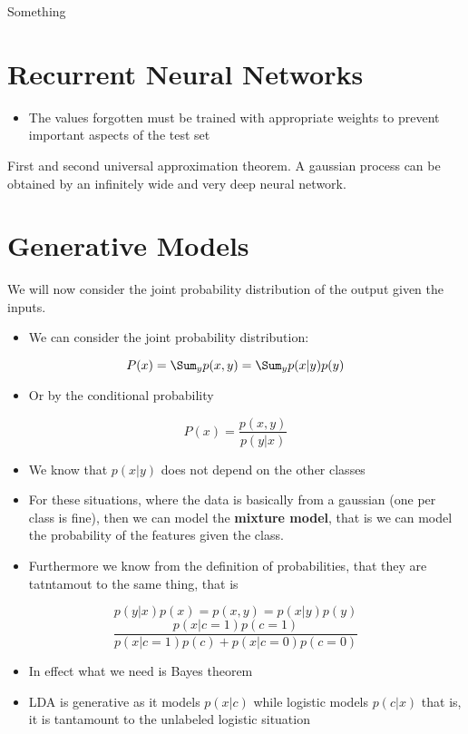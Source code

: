 \documentclass[12pt,a4paper,oneside,headinclude]{scrartcl}
\numberwithin{figure}{section}
\numberwithin{equation}{section}
\numberwithin{table}{section}
\begin{document}
Something
\section{Recurrent Neural Networks}
\label{sec:org90fb63f}
\begin{itemize}
\item The values forgotten must be trained with appropriate weights to prevent
important aspects of the test set
\end{itemize}

First and second universal approximation theorem.
A gaussian process can be obtained by an infinitely wide and very deep neural
network.
\section{Generative Models}
\label{sec:orgc69b445}
We will now consider the joint probability distribution of the output given the
inputs.

\begin{itemize}
\item We can consider the joint probability distribution:
\end{itemize}
$$P(x)=\Sum_y p(x,y)=\Sum_y p(x|y)p(y)$$

\begin{itemize}
\item Or by the conditional probability
\end{itemize}
$$P(x)=\frac{p(x,y)}{p(y|x)}$$

\begin{itemize}
\item We know that \(p(x|y)\) does not depend on the other classes

\item For these situations, where the data is basically from a gaussian (one per
class is fine), then we can model the \textbf{mixture model}, that is we can model
the probability of the features given the class.
\item Furthermore we know from the definition of probabilities, that they are
tatntamout to the same thing, that is
\end{itemize}
$$p(y|x)p(x)=p(x,y)=p(x|y)p(y)$$
$$\frac{p(x|c=1)p(c=1)}{p(x|c=1)p(c)+p(x|c=0)p(c=0)}$$

\begin{itemize}
\item In effect what we need is Bayes theorem
\item LDA is generative as it models \(p(x|c)\) while logistic models \(p(c|x)\) that
is, it is tantamount to the unlabeled logistic situation
\end{itemize}
\end{document}
